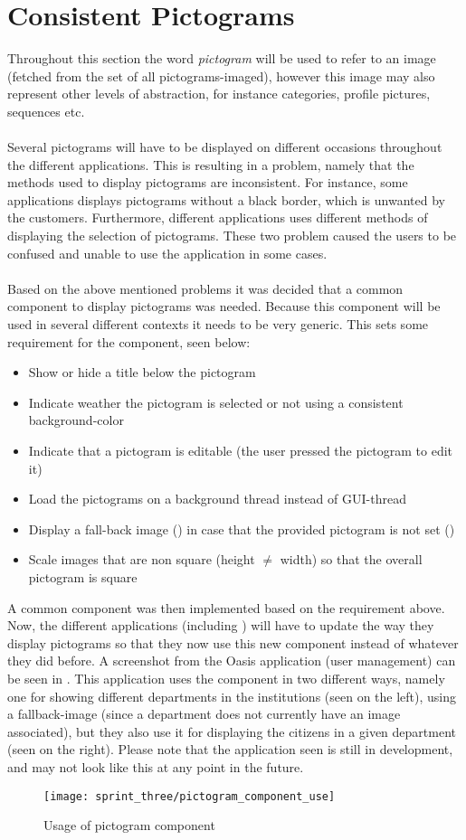 
\section{Consistent Pictograms}
\label{sec:consistent_pictograms}

Throughout this section the word \textit{pictogram} will be used to refer to an image (fetched from the set of all pictograms-imaged), however this image may also represent other levels of abstraction, for instance categories, profile pictures, sequences etc.
\\\\
Several pictograms will have to be displayed on different occasions throughout the different \giraf applications. This is resulting in a problem, namely that the methods used to display pictograms are inconsistent. For instance, some applications displays pictograms without a black border, which is unwanted by the customers. Furthermore, different applications uses different methods of displaying the selection of pictograms. These two problem caused the users to be confused and unable to use the application in some cases. 
\\\\
Based on the above mentioned problems it was decided that a common component to display pictograms was needed. Because this component will be used in several different contexts it needs to be very generic. This sets some requirement for the component, seen below:

\begin{itemize}
	\item Show or hide a title below the pictogram
	\item Indicate weather the pictogram is selected or not using a consistent background-color
	\item Indicate that a pictogram is editable (the user pressed the pictogram to edit it)
	\item Load the pictograms on a background thread instead of GUI-thread 
	\item Display a fall-back image () in case that the provided pictogram is not set ()
	\item Scale images that are non square (height $\neq$ width) so that the overall pictogram is square
\end{itemize}

A common component was then implemented based on the requirement above. Now, the different applications (including \ct) will have to update the way they display pictograms so that they now use this new component instead of whatever they did before. A screenshot from the Oasis application (user management) can be seen in . This application uses the component in two different ways, namely one for showing different departments in the institutions (seen on the left), using a fallback-image (since a department does not currently have an image associated), but they also use it for displaying the citizens in a given department (seen on the right). Please note that the application seen is still in development, and may not look like this at any point in the future. 

\begin{figure}[!htbp]
	\centering
	\texttt{[image: sprint\_three/pictogram\_component\_use]}
	\caption{Usage of pictogram component}
	\label{fig:pictogram_component_use}
\end{figure}